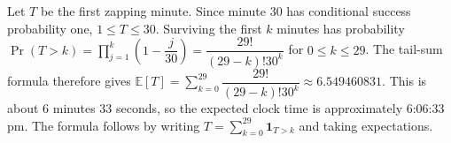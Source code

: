 Let $T$ be the first zapping minute. Since minute $30$ has conditional success probability one, $1\le T\le30$. Surviving the first $k$ minutes has probability $\Pr(T>k)=\prod_{j=1}^k(1-\dfrac{j}{30})=\dfrac{29!}{(29-k)!30^k}$ for $0\le k\le29$. The tail-sum formula therefore gives $\boxed{\mathbb E[T]=\sum_{k=0}^{29}\dfrac{29!}{(29-k)!30^k}\approx6.549460831}$. This is about $6$ minutes $33$ seconds, so the expected clock time is approximately 6:06:33 pm. The formula follows by writing $T=\sum_{k=0}^{29}\mathbf1_{T>k}$ and taking expectations.
